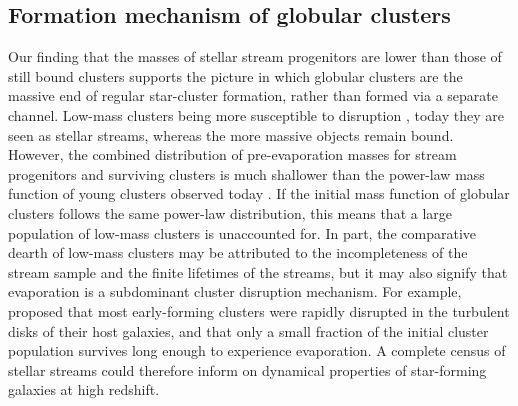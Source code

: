 \documentclass[twocolumn]{aastex63}
\newcommand{\msun}{\ensuremath{\textrm{M}_\odot}}
\begin{document}
\subsection{Formation mechanism of globular clusters}
\label{sec:discuss_gcform}
Our finding that the masses of stellar stream progenitors are lower than those of still bound clusters supports the picture in which globular clusters are the massive end of regular star-cluster formation, rather than formed via a separate channel.
Low-mass clusters being more susceptible to disruption \citep[e.g.,][]{fall:2001,kruijssen15b}, today they are seen as stellar streams, whereas the more massive objects remain bound.
However, the combined distribution of pre-evaporation masses for stream progenitors and surviving clusters is much shallower than the power-law mass function of young clusters observed today \citep[e.g.,][]{zhang:1999}.
If the initial mass function of globular clusters follows the same power-law distribution, this means that a large population of low-mass clusters is unaccounted for.
In part, the comparative dearth of low-mass clusters may be attributed to the incompleteness of the stream sample and the finite lifetimes of the streams, but it may also signify that evaporation is a subdominant cluster disruption mechanism.
For example, \citet{kruijssen15b} proposed that most early-forming clusters were rapidly disrupted in the turbulent disks of their host galaxies, and that only a small fraction of the initial cluster population survives long enough to experience evaporation.
A complete census of stellar streams could therefore inform on dynamical properties of star-forming galaxies at high redshift.
\end{document}
